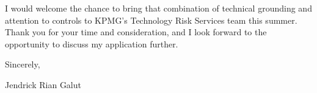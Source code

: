 \documentclass[letterpaper,11pt]{article}
\begin{document}
I would welcome the chance to bring that combination of technical grounding and attention to controls to KPMG's Technology Risk Services team this summer. Thank you for your time and consideration, and I look forward to the opportunity to discuss my application further.

Sincerely,

Jendrick Rian Galut
\end{document}
